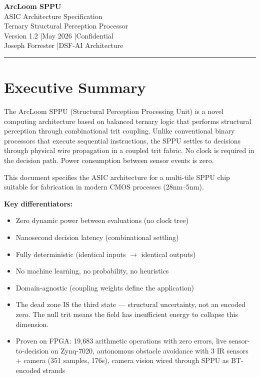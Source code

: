 \documentclass[11pt, a4paper]{article}
\begin{document}
\begin{center}
  {\LARGE \textbf{ArcLoom SPPU}}\\[6pt]
  {\large ASIC Architecture Specification}\\[4pt]
  {\large Ternary Structural Perception Processor}\\[8pt]
  {\color{tfe-gray}\small Version 1.2 \quad|\quad May 2026 \quad|\quad Confidential}\\[4pt]
  {\color{tfe-gray}\small Joseph Forrester \quad|\quad DSF-AI Architecture}
\end{center}

\vspace{1em}
\hrule
\vspace{1em}

\section{Executive Summary}

The ArcLoom SPPU (Structural Perception Processing Unit) is a novel computing
architecture based on balanced ternary logic that performs structural
perception through combinational trit coupling. Unlike conventional
binary processors that execute sequential instructions, the SPPU
settles to decisions through physical wire propagation in a coupled
trit fabric. No clock is required in the decision path. Power
consumption between sensor events is zero.

This document specifies the ASIC architecture for a multi-tile SPPU
chip suitable for fabrication in modern CMOS processes (28nm--5nm).

\textbf{Key differentiators:}
\begin{itemize}[nosep]
  \item Zero dynamic power between evaluations (no clock tree)
  \item Nanosecond decision latency (combinational settling)
  \item Fully deterministic (identical inputs $\rightarrow$ identical outputs)
  \item No machine learning, no probability, no heuristics
  \item Domain-agnostic (coupling weights define the application)
  \item The dead zone IS the third state --- structural uncertainty,
        not an encoded zero. The null trit means the field has
        insufficient energy to collapse this dimension.
  \item Proven on FPGA: 19,683 arithmetic operations with zero errors,
        live sensor-to-decision on Zynq-7020, autonomous obstacle
        avoidance with 3 IR sensors + camera (351 samples, 176s),
        camera vision wired through SPPU as BT-encoded strands
\end{itemize}
\end{document}
